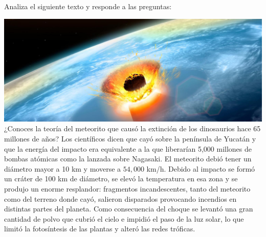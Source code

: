 Analiza el siguiente texto y responde a las preguntas:

\begin{boxE}
    \includegraphics[width=\linewidth]{../images/5582.jpg}
    ¿Conoces la teoría del meteorito que causó la extinción de los dinosaurios
    hace 65 millones de años? Los científicos dicen que cayó sobre la península
    de Yucatán y que la energía del impacto era equivalente a la que liberarían
    5,000 millones de bombas atómicas como la lanzada sobre Nagasaki. El
    meteorito debió tener un diámetro mayor a 10 km y moverse a $54,000$ km/h.
    Debido al impacto se formó un cráter de 100 km de diámetro, se elevó
    la temperatura en esa zona y se produjo un enorme resplandor: fragmentos
    incandescentes, tanto del meteorito como del terreno donde cayó, salieron
    disparados provocando incendios en distintas partes del planeta.
    Como consecuencia del choque se levantó una gran cantidad de polvo
    que cubrió el cielo e impidió el paso de la luz solar, lo que limitó la fotosíntesis de las plantas y alteró las redes tróficas.
\end{boxE}

\begin{parts}
    
    
    
\end{parts}
